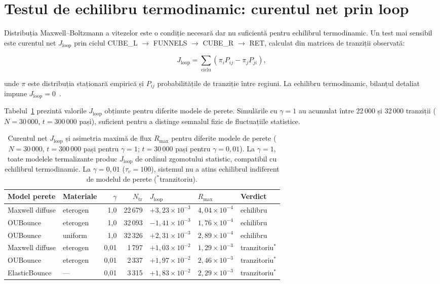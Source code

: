 \documentclass[12pt,openright,twoside]{book}
\begin{document}
\section[Testul de echilibru termodinamic]{Testul de echilibru termodinamic: curentul net prin loop}
\label{subsec:ness}

Distribuția Maxwell--Boltzmann a vitezelor este o condiție necesară dar nu suficientă pentru echilibrul termodinamic. Un test mai sensibil este curentul net $J_\text{loop}$ prin ciclul CUBE\_L $\to$ FUNNELS $\to$ CUBE\_R $\to$ RET, calculat din matricea de tranziții observată:

\begin{equation}
    J_\text{loop} = \sum_{\text{ciclu}} \left(\pi_i P_{ij} - \pi_j P_{ji}\right),
\end{equation}

unde $\pi$ este distribuția staționară empirică și $P_{ij}$ probabilitățile de tranziție între regiuni. La echilibru termodinamic, bilanțul detaliat impune $J_\text{loop} = 0$~\cite{onsager1931,jiang2004}.

Tabelul~\ref{tab:jloop} prezintă valorile $J_\text{loop}$ obținute pentru diferite modele de perete. Simulările cu $\gamma=1$ au acumulat între 22\,000 și 32\,000 tranziții ($N=30\,000$, $t=300\,000$ pași), suficient pentru a distinge semnalul fizic de fluctuațiile statistice.

\begin{table}[ht]
\centering
\begin{tabular}{llrrlll}
\toprule
Model perete & Materiale & $\gamma$ & $N_\text{tr}$ & $J_\text{loop}$ & $R_\text{max}$ & Verdict \\
\midrule
Maxwell diffuse  & eterogen & 1{,}0 & 22\,679 & $+3{,}23\times10^{-3}$ & $4{,}04\times10^{-4}$ & echilibru \\
OUBounce         & eterogen & 1{,}0 & 32\,093 & $-1{,}41\times10^{-3}$ & $1{,}76\times10^{-4}$ & echilibru \\
OUBounce         & uniform  & 1{,}0 & 32\,326 & $+2{,}31\times10^{-3}$ & $2{,}89\times10^{-4}$ & echilibru \\
\midrule
Maxwell diffuse  & eterogen & 0{,}01 & 1\,797 & $+1{,}03\times10^{-2}$ & $1{,}29\times10^{-3}$ & tranzitoriu$^*$ \\
OUBounce         & eterogen & 0{,}01 & 2\,337 & $+1{,}97\times10^{-2}$ & $2{,}46\times10^{-3}$ & tranzitoriu$^*$ \\
ElasticBounce    & —        & 0{,}01 & 3\,315 & $+1{,}83\times10^{-2}$ & $2{,}29\times10^{-3}$ & tranzitoriu$^*$ \\
\bottomrule
\end{tabular}
\caption{Curentul net $J_\text{loop}$ și asimetria maximă de flux $R_\text{max}$ pentru diferite modele de perete ($N=30\,000$, $t=300\,000$ pași pentru $\gamma=1$; $t=30\,000$ pași pentru $\gamma=0{,}01$). La $\gamma=1$, toate modelele termalizante produc $J_\text{loop}$ de ordinul zgomotului statistic, compatibil cu echilibrul termodinamic. La $\gamma=0{,}01$ ($\tau_v = 100$), sistemul nu a atins echilibrul indiferent de modelul de perete ($^*$tranzitoriu).}
\label{tab:jloop}
\end{table}
\end{document}
